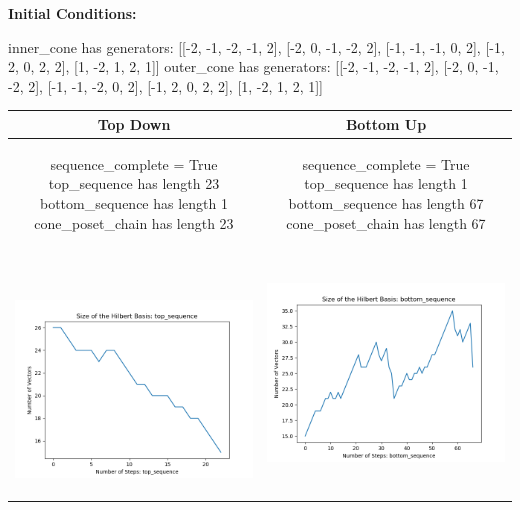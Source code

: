 \documentclass[10pt]{article}
\begin{document}
\textbf{Initial Conditions:}
\begin{SAGE}
inner_cone has generators: 
[[-2, -1, -2, -1, 2], [-2, 0, -1, -2, 2], [-1, -1, -1, 0, 2], [-1, 2, 0, 2, 2], [1, -2, 1, 2, 1]]
outer_cone has generators: 
[[-2, -1, -2, -1, 2], [-2, 0, -1, -2, 2], [-1, -1, -2, 0, 2], [-1, 2, 0, 2, 2], [1, -2, 1, 2, 1]]

\end{SAGE}
\begin{tabular}{c|c}
\textbf{Top Down} & \textbf{Bottom Up} \\ \hline  
\begin{SAGE}
	sequence_complete = True
	top_sequence has length 23
	bottom_sequence has length 1
	cone_poset_chain has length 23
\end{SAGE} 
&
\begin{SAGE}
	sequence_complete = True
	top_sequence has length 1
	bottom_sequence has length 67
	cone_poset_chain has length 67
\end{SAGE} 
\\ \hline
\
\begin{minipage}{.45\textwidth}
\includegraphics[width=\textwidth]{"DATA/5d/5 generators 2 bound D/top_sequence SIZE"}
\end{minipage} &
\begin{minipage}{.45\textwidth}
\includegraphics[width=\textwidth]{"DATA/5d/5 generators 2 bound D bottomup/bottom_sequence SIZE"}

\end{minipage}
\end{tabular}
\end{document}

